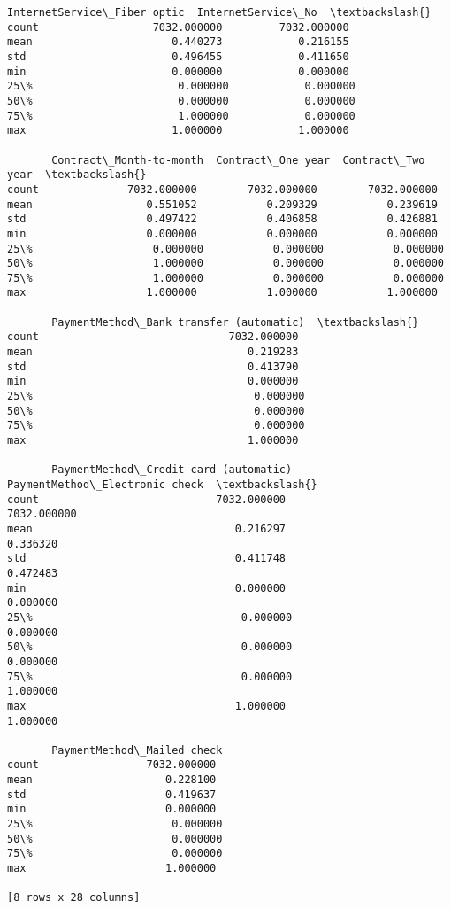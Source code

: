 \documentclass[11pt]{article}
\begin{document}
\begin{tcolorbox}[breakable, boxrule=.5pt, size=fbox, pad at break*=1mm, opacityfill=0]
\begin{Verbatim}[commandchars=\\\{\}]
       InternetService\_Fiber optic  InternetService\_No  \textbackslash{}
count                  7032.000000         7032.000000
mean                      0.440273            0.216155
std                       0.496455            0.411650
min                       0.000000            0.000000
25\%                       0.000000            0.000000
50\%                       0.000000            0.000000
75\%                       1.000000            0.000000
max                       1.000000            1.000000

       Contract\_Month-to-month  Contract\_One year  Contract\_Two year  \textbackslash{}
count              7032.000000        7032.000000        7032.000000
mean                  0.551052           0.209329           0.239619
std                   0.497422           0.406858           0.426881
min                   0.000000           0.000000           0.000000
25\%                   0.000000           0.000000           0.000000
50\%                   1.000000           0.000000           0.000000
75\%                   1.000000           0.000000           0.000000
max                   1.000000           1.000000           1.000000

       PaymentMethod\_Bank transfer (automatic)  \textbackslash{}
count                              7032.000000
mean                                  0.219283
std                                   0.413790
min                                   0.000000
25\%                                   0.000000
50\%                                   0.000000
75\%                                   0.000000
max                                   1.000000

       PaymentMethod\_Credit card (automatic)  PaymentMethod\_Electronic check  \textbackslash{}
count                            7032.000000                     7032.000000
mean                                0.216297                        0.336320
std                                 0.411748                        0.472483
min                                 0.000000                        0.000000
25\%                                 0.000000                        0.000000
50\%                                 0.000000                        0.000000
75\%                                 0.000000                        1.000000
max                                 1.000000                        1.000000

       PaymentMethod\_Mailed check
count                 7032.000000
mean                     0.228100
std                      0.419637
min                      0.000000
25\%                      0.000000
50\%                      0.000000
75\%                      0.000000
max                      1.000000

[8 rows x 28 columns]
\end{Verbatim}
\end{tcolorbox}
        
\end{document}
